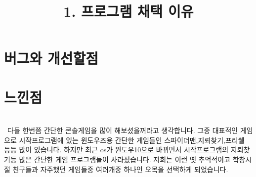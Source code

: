 \documentclass[a4paper, 11pt]{article}
\begin{document}
   
   \vspace{1cm}
   \section{버그와 개선할점}
   
   \vspace{1cm}
   \section{느낀점}
   
   
	\newpage
	\title{\textbf{\Huge1. 프로그램 채택 이유}}
	\\
   \ 다들 한번쯤 간단한 콘솔게임을 많이 해보셨을꺼라고 생각합니다. 그중 대표적인 게임으로 시작프로그램에 있는 윈도우즈용 간단한 게임들인 스파이더맨,지뢰찾기,프리쉘 등등 많이 있습니다. 하지만 최근 os가 윈도우10으로 바뀌면서 시작프로그램의 지뢰찾기등 많은 간단한 게임 프로그램들이 사라졌습니다. 저희는 이런 옛 추억적이고 학창시절 친구들과 자주했던 게임들중 여러개중 하나인 오목을 선택하게 되었습니다.
   
   
   
\end{document}
